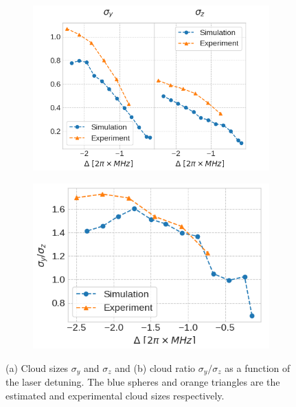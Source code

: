 \begin{figure}[!ht]
    \centering
    \begin{subfigure}[b]{0.5\linewidth}
        \centering
        \includegraphics[width=\textwidth]{USPSC-img/dy_cloud_size.png}
        \label{fig:Dreon-cloud-size}
    \end{subfigure}
    \hfill
    \begin{subfigure}[b]{0.45\linewidth}
        \centering
        \includegraphics[width=\textwidth]{USPSC-img/dy_cloud_size_ratio.png}
        \label{fig:Dreon-cloud-size-ratio}
    \end{subfigure}
    \caption{(a) Cloud sizes $ \sigma_y $ and $ \sigma_z $ and (b) cloud ratio $ \sigma_y / \sigma_z $ as a function of the laser detuning. The blue spheres and orange triangles are the estimated and experimental cloud sizes respectively.}
\end{figure}

